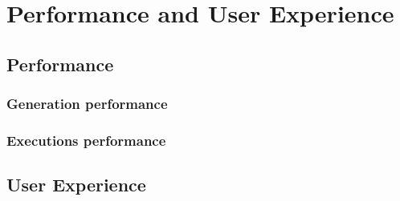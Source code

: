 \chapter{Performance and User Experience}
\label{chap:perfux}

\section{Performance}

\subsection{Generation performance}


\subsection{Executions performance}

\section{User Experience}